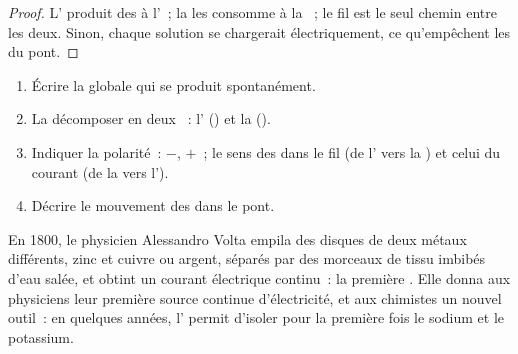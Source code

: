 \begin{proof}
L' produit des  à l'~; la  les consomme
à la ~; le fil est le seul chemin entre les deux. Sinon, chaque
solution se chargerait électriquement, ce qu'empêchent les  du pont.
\end{proof}

\begin{method}\label{met:g12:cells-and-electrolysis:describe}
\begin{enumerate}
  \item Écrire la  globale qui se produit
        spontanément.
  \item La décomposer en deux ~: l' () et la
         ().
  \item Indiquer la polarité~:  $-$,  $+$~; le sens des
         dans le fil (de l' vers la ) et celui du
        courant (de la  vers l').
  \item Décrire le mouvement des  dans le pont.
\end{enumerate}
\end{method}


\begin{history}
En 1800, le physicien Alessandro Volta empila des disques de deux
métaux différents, zinc et cuivre ou argent, séparés par des morceaux de
tissu imbibés d'eau salée, et obtint un courant électrique continu~: la
première . Elle donna aux physiciens leur première source continue
d'électricité, et aux chimistes un nouvel outil~: en quelques années,
l' permit d'isoler pour la première fois le sodium et le
potassium.
\end{history}

